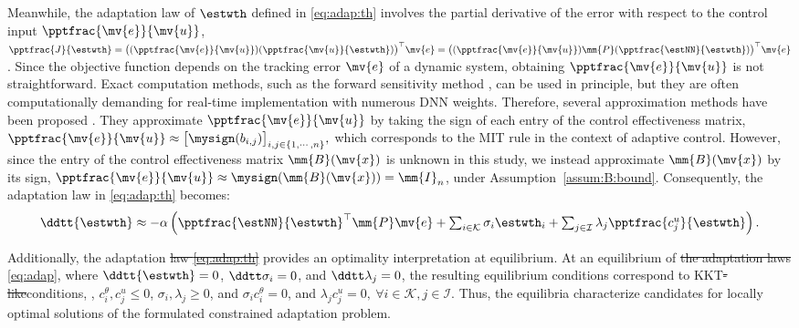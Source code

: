 \documentclass[letterpaper, journal, twoside]{IEEEtran}
\providecommand{\DIFadd}[1]{{\protect\color{blue}\uwave{#1}}} %
\providecommand{\DIFdel}[1]{{\protect\color{red}\sout{#1}}} %
\providecommand{\DIFaddbegin}{} %
\providecommand{\DIFaddend}{} %
\providecommand{\DIFdelbegin}{} %
\providecommand{\DIFdelend}{} %
\begin{document}
Meanwhile, the adaptation law of $\estwth$ defined in \eqref{eq:adap:th} involves the partial derivative of the error with respect to the control input $\pptfrac{\mv{e}}{\mv{u}}$, \ie 
$
    \pptfrac{J}{\estwth}
    =
    \big(
        (\pptfrac{\mv{e}}{\mv{u}})
        (\pptfrac{\mv{u}}{\estwth})
    \big)
    ^\top \mv{e}
    =
    \big(
        (\pptfrac{\mv{e}}{\mv{u}})
        \mm{P}
        (\pptfrac{\estNN}{\estwth})
    \big)
    ^\top \mv{e}
$. 
Since the objective function depends on the tracking error $\mv{e}$ of a dynamic system, obtaining $\pptfrac{\mv{e}}{\mv{u}}$ is not straightforward. 
Exact computation methods, such as the forward sensitivity method \cite{Khalil:2002aa,Ryu:2025ab}, can be used in principle, but they are often computationally demanding for real-time implementation with numerous DNN weights.
Therefore, several approximation methods have been proposed \cite{Douratsos:2007aa,Saerens:1991aa}.
They approximate $\pptfrac{\mv{e}}{\mv{u}}$ by taking the sign of each entry of the control effectiveness matrix, \ie
$
  \pptfrac{\mv{e}}{\mv{u}}
  \approx
  \big[
    \mysign
    (
    b_{i,j}
    )
  \big]_{i,j\in\{1,\cdots,n\}}
  ,
$
which corresponds to the MIT rule in the context of adaptive control.
However, since the entry of the control effectiveness matrix $\mm{B}(\mv{x})$ is unknown in this study, we instead approximate $\mm{B}(\mv{x})$ by its sign, \ie $\pptfrac{\mv{e}}{\mv{u}}\approx\mysign(\mm{B}(\mv{x}))=\mm{I}_{n}$, under Assumption~\ref{assum:B:bound}.
Consequently, the adaptation law in \eqref{eq:adap:th} becomes:
\begin{equation}
  \ddtt{\estwth}
  \approx
  -\alpha 
  \left(
    {\pptfrac{\estNN}
    {\estwth}}^\top
    \mm{P}
    \mv{e}
    +
    \textstyle\sum_{i\in\mathcal{K}}
    \sigma_i 
    \estwth_i
    +
    \textstyle\sum_{j\in\mathcal{I}}
    \lambda_j 
    \pptfrac{c^{u}_{j}}{\estwth}
  \right)
  .
  \label{eq:adap:th:approx}
\end{equation}

Additionally, the adaptation \DIFdelbegin \DIFdel{law \eqref{eq:adap:th} }\DIFdelend \DIFaddbegin \DIFadd{laws \eqref{eq:adap} }\DIFaddend provides an optimality interpretation at equilibrium.
At an equilibrium of \DIFdelbegin \DIFdel{the adaptation laws }\DIFdelend \eqref{eq:adap}, where \DIFdelbegin \DIFdel{$\ddtt{\estwth}=0$}\DIFdelend \DIFaddbegin \DIFadd{$\ddtt{\estwth}=\mv{0}$}\DIFaddend , $\ddtt\sigma_i=0$, and $\ddtt\lambda_j=0$, the resulting equilibrium conditions correspond to KKT\DIFdelbegin \DIFdel{-like}\DIFdelend  conditions, \ie \DIFdelbegin \DIFdel{$\pptfrac{L}{\estwth}\approx0$}\DIFdelend \DIFaddbegin \DIFadd{$\pptfrac{L}{\estwth}=0$}\DIFaddend , $c^{\theta}_i,c^{u}_j \le 0$, $\sigma_i,\lambda_j \ge 0$, and $\sigma_i c^{\theta}_i=0$, and $\lambda_j c^{u}_j=0,\ \forall i\in\mathcal{K},j\in\mathcal{I}$.
Thus, the equilibria characterize candidates for locally optimal solutions of the formulated constrained adaptation problem.
\end{document}
